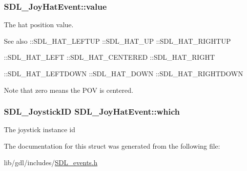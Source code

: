 \subsubsection[{value}]{ S\+D\+L\+\_\+\+Joy\+Hat\+Event\+::value}\label{struct_s_d_l___joy_hat_event_a52b179a34407449941b61d988ca72ef4}
The hat position value. \begin{DoxySeeAlso}{See also}
\+::\+S\+D\+L\+\_\+\+H\+A\+T\+\_\+\+L\+E\+F\+T\+U\+P \+::\+S\+D\+L\+\_\+\+H\+A\+T\+\_\+\+U\+P \+::\+S\+D\+L\+\_\+\+H\+A\+T\+\_\+\+R\+I\+G\+H\+T\+U\+P 

\+::\+S\+D\+L\+\_\+\+H\+A\+T\+\_\+\+L\+E\+F\+T \+::\+S\+D\+L\+\_\+\+H\+A\+T\+\_\+\+C\+E\+N\+T\+E\+R\+E\+D \+::\+S\+D\+L\+\_\+\+H\+A\+T\+\_\+\+R\+I\+G\+H\+T 

\+::\+S\+D\+L\+\_\+\+H\+A\+T\+\_\+\+L\+E\+F\+T\+D\+O\+W\+N \+::\+S\+D\+L\+\_\+\+H\+A\+T\+\_\+\+D\+O\+W\+N \+::\+S\+D\+L\+\_\+\+H\+A\+T\+\_\+\+R\+I\+G\+H\+T\+D\+O\+W\+N
\end{DoxySeeAlso}
Note that zero means the P\+O\+V is centered. \hypertarget{struct_s_d_l___joy_hat_event_ac9d9bb179f9116d16b3da47cacd74b55}{}
\subsubsection[{which}]{\setlength{\rightskip}{0pt plus 5cm}S\+D\+L\+\_\+\+Joystick\+I\+D S\+D\+L\+\_\+\+Joy\+Hat\+Event\+::which}\label{struct_s_d_l___joy_hat_event_ac9d9bb179f9116d16b3da47cacd74b55}
The joystick instance id 

The documentation for this struct was generated from the following file\+:\begin{DoxyCompactItemize}
\item 
lib/gdl/includes/\hyperlink{_s_d_l__events_8h}{S\+D\+L\+\_\+events.\+h}\end{DoxyCompactItemize}
